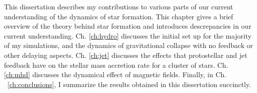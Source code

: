 \documentclass[../dissertation.tex]{subfiles}
\begin{document}
This dissertation describes my contributions to various parts of our current understanding of the dynamics of star formation. 
This chapter gives a brief overview of the theory behind star formation and introduces descrepancies in our current understanding. 
Ch. \ref{ch:hydro} discusses the initial set up for the majority of my simulations, and the dynamics of gravitational collapse with no feedback or other delaying aspects.
Ch. \ref{ch:jet} discusses the effects that protostellar and jet feedback have on the stellar mass accretion rate for a cluster of stars.
Ch. \ref{ch:mhd} discusses the dynamical effect of magnetic fields. %
Finally, in Ch. ~\ref{ch:conclusions}, I summarize the results obtained in this dissertation succinctly.
\end{document}
